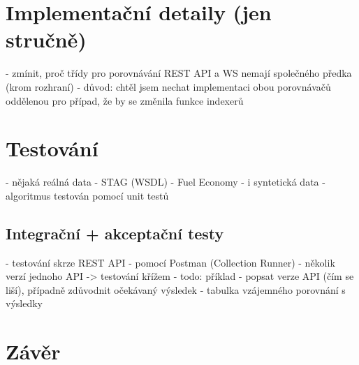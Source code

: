 \documentclass[czech,DP]{thesiskiv}
\begin{document}
\chapter{Implementační detaily (jen stručně)}

 - zmínit, proč třídy pro porovnávání REST API a WS nemají společného předka (krom rozhraní)
 	- důvod: chtěl jsem nechat implementaci obou porovnávačů oddělenou pro případ, že by se změnila funkce indexerů

\chapter{Testování}

- nějaká reálná data
	- STAG (WSDL)
	- Fuel Economy
- i syntetická data
- algoritmus testován pomocí unit testů

\section{Integrační + akceptační testy}

- testování skrze REST API
- pomocí Postman (Collection Runner)
- několik verzí jednoho API -> testování křížem
- todo: příklad
	- popsat verze API (čím se liší), případně zdůvodnit očekávaný výsledek
	- tabulka vzájemného porovnání s výsledky

\chapter{Závěr}	

 
% 
%

{\raggedright\small

}
\end{document}
